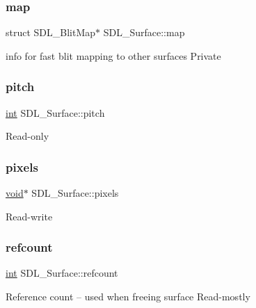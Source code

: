\subsubsection{\texorpdfstring{map}{map}}
{\footnotesize\ttfamily struct S\+D\+L\+\_\+\+Blit\+Map$\ast$ S\+D\+L\+\_\+\+Surface\+::map}

info for fast blit mapping to other surfaces Private \mbox{\label{struct_s_d_l___surface_a5fa37325d77d65b2ed64ffc7cd01bb6c}} 
\subsubsection{\texorpdfstring{pitch}{pitch}}
{\footnotesize\ttfamily \mbox{\hyperlink{warnings_8h_a74f207b5aa4ba51c3a2ad59b219a423b}{int}} S\+D\+L\+\_\+\+Surface\+::pitch}

Read-\/only \mbox{\label{struct_s_d_l___surface_abd9597e0e084b8ef33fe0397bc26d911}} 
\subsubsection{\texorpdfstring{pixels}{pixels}}
{\footnotesize\ttfamily \mbox{\hyperlink{_s_d_l__opengles2__gl2ext_8h_ae5d8fa23ad07c48bb609509eae494c95}{void}}$\ast$ S\+D\+L\+\_\+\+Surface\+::pixels}

Read-\/write \mbox{\label{struct_s_d_l___surface_a03d10628a359c0674f5ceffd574f1641}} 
\subsubsection{\texorpdfstring{refcount}{refcount}}
{\footnotesize\ttfamily \mbox{\hyperlink{warnings_8h_a74f207b5aa4ba51c3a2ad59b219a423b}{int}} S\+D\+L\+\_\+\+Surface\+::refcount}

Reference count -- used when freeing surface Read-\/mostly \mbox{\label{struct_s_d_l___surface_ae66d973dcb9b57cb34815892e1ee1f31}} 
